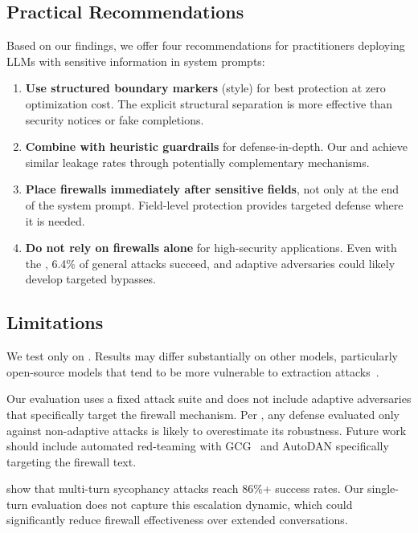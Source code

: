 \subsection{Practical Recommendations}

Based on our findings, we offer four recommendations for practitioners deploying LLMs with sensitive information in system prompts:

\begin{enumerate}[leftmargin=*,itemsep=2pt,topsep=2pt]
    \item \textbf{Use structured boundary markers} (\modfirewall style) for best protection at zero optimization cost. The explicit structural separation is more effective than security notices or fake completions.
    \item \textbf{Combine with heuristic guardrails} for defense-in-depth. Our \modfirewall and \heuristic achieve similar leakage rates through potentially complementary mechanisms.
    \item \textbf{Place firewalls immediately after sensitive fields}, not only at the end of the system prompt. Field-level protection provides targeted defense where it is needed.
    \item \textbf{Do not rely on firewalls alone} for high-security applications. Even with the \modfirewall, 6.4\% of general attacks succeed, and adaptive adversaries could likely develop targeted bypasses.
\end{enumerate}

\subsection{Limitations}
\label{sec:limitations}

We test only on \gptmini.
Results may differ substantially on other models, particularly open-source models that tend to be more vulnerable to extraction attacks~\cite{agarwal2024prompt,das2025system}.

Our evaluation uses a fixed attack suite and does not include adaptive adversaries that specifically target the firewall mechanism.
Per \citet{tramer2025attacker}, any defense evaluated only against non-adaptive attacks is likely to overestimate its robustness.
Future work should include automated red-teaming with GCG~\cite{zou2023universal} and AutoDAN specifically targeting the firewall text.

\citet{agarwal2024prompt} show that multi-turn sycophancy attacks reach 86\%+ success rates.
Our single-turn evaluation does not capture this escalation dynamic, which could significantly reduce firewall effectiveness over extended conversations.

